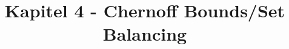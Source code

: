 
\title{Kapitel 4 - Chernoff Bounds/Set Balancing}


\maketitle
\tableofcontents
\newpage


\newpage




